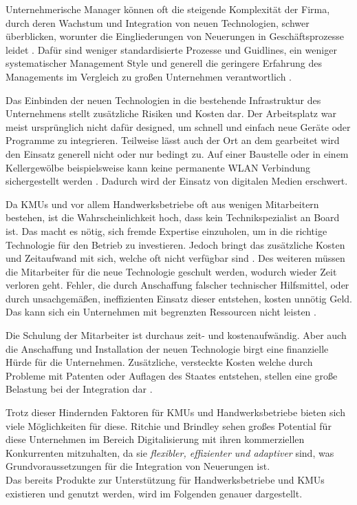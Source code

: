 Unternehmerische Manager können oft die steigende Komplexität der Firma, durch deren Wachstum und Integration von neuen Technologien, schwer überblicken, worunter die Eingliederungen von Neuerungen in Geschäftsprozesse leidet \cite{rothwell_small_1989}. Dafür sind weniger standardisierte Prozesse und Guidlines, ein weniger systematischer Management Style und generell die geringere Erfahrung des Managements im Vergleich zu großen Unternehmen verantwortlich \cite{allocca_innovation_2006}. 

Das Einbinden der neuen Technologien in die bestehende Infrastruktur des Unternehmens stellt zusätzliche Risiken und Kosten dar. Der Arbeitsplatz war meist ursprünglich nicht dafür designed, um schnell und einfach neue Geräte oder Programme zu integrieren. Teilweise lässt auch der Ort an dem gearbeitet wird den Einsatz generell nicht oder nur bedingt zu. Auf einer Baustelle oder in einem Kellergewölbe beispielsweise kann keine permanente WLAN Verbindung sichergestellt werden \cite{klinker_fliesen_2019}. Dadurch wird der Einsatz von digitalen Medien erschwert.

Da KMUs und vor allem Handwerksbetriebe oft aus wenigen Mitarbeitern bestehen, ist die Wahrscheinlichkeit hoch, dass kein Technikspezialist an Board ist. Das macht es nötig, sich fremde Expertise einzuholen, um in die richtige Technologie für den Betrieb zu investieren. Jedoch bringt das zusätzliche Kosten und Zeitaufwand mit sich, welche oft nicht verfügbar sind \cite{rothwell_small_1989}. Des weiteren müssen die Mitarbeiter für die neue Technologie geschult werden, wodurch wieder Zeit verloren geht. Fehler, die durch Anschaffung falscher technischer Hilfsmittel, oder durch unsachgemäßen, ineffizienten Einsatz dieser entstehen, kosten unnötig Geld. Das kann sich ein Unternehmen mit begrenzten Ressourcen nicht leisten \cite{allocca_innovation_2006}.

Die Schulung der Mitarbeiter ist durchaus zeit- und kostenaufwändig. Aber auch die Anschaffung und Installation der neuen Technologie birgt eine finanzielle Hürde für die Unternehmen. Zusätzliche, versteckte Kosten welche durch Probleme mit Patenten oder Auflagen des Staates entstehen, stellen eine große Belastung bei der Integration dar \cite{rothwell_small_1989}. 

Trotz dieser Hindernden Faktoren für KMUs und Handwerksbetriebe bieten sich viele Möglichkeiten für diese. Ritchie und Brindley \cite{ritchie_ict_2005} sehen großes Potential für diese Unternehmen im Bereich Digitalisierung mit ihren kommerziellen Konkurrenten mitzuhalten, da sie \textit{flexibler, effizienter und adaptiver} sind, was Grundvoraussetzungen für die Integration von Neuerungen ist. \\
Das bereits Produkte zur Unterstützung für Handwerksbetriebe und KMUs existieren und genutzt werden, wird im Folgenden genauer dargestellt.

